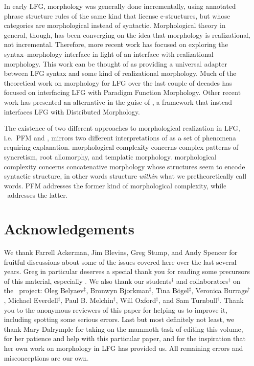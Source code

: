 \documentclass[output=paper,hidelinks]{langscibook}
\begin{document}
In early LFG, morphology was generally done incrementally, using
annotated phrase structure rules of the same kind that license
c-structures, but whose categories are morphological instead of
syntactic. Morphological theory in general, though, has been
converging on the idea that morphology is realizational, not
incremental. Therefore, more recent work has focused on exploring the
syntax--morphology interface
\citep[ch.\,12]{dalrymple15,DLM:LFG} in light of an interface with
realizational morphology. This work can be thought of as
providing a universal adapter between LFG syntax and some kind of
realizational morphology. Much of the theoretical work on
morphology for LFG over the last couple of decades has focused on
interfacing LFG with Paradigm Function Morphology. Other recent work has
presented an alternative in the guise of \lrfg, a framework that instead
interfaces LFG with Distributed Morphology.
 
The existence of two different approaches to morphological realization
in LFG, i.e.\ PFM and \lrfg, mirrors two different interpretations of
 as a set of phenomena requiring
explanation.  morphological complexity
\citep[see, e.g.,][]{baerman;etal2017} concerns
complex patterns of syncretism, root allomorphy, and templatic
morphology.   morphological complexity 
concerns concatenative morphology whose structures seem to encode
syntactic structure, in other words structure \emph{within} what we
pretheoretically call words. PFM addresses the former kind of
morphological complexity, while \lrfg\ addresses the latter. 

\section*{Acknowledgements}

We thank Farrell Ackerman, Jim Blevins, Greg Stump, and Andy Spencer
for fruitful discussions about some of the issues covered here over
the last several years. Greg in particular deserves a special thank
you for reading some precursors of this material, especially
. We also thank our students$^\dag$ and
collaborators$^\ddag$ on the \lrfg\ project: Oleg Belyaev$^\ddag$,
Bronwyn Bjorkman$^\ddag$, Tina B\"{o}gel$^\ddag$, Veronica
Burrage$^\dag$, Michael Everdell$^\ddag$, Paul B. Melchin$^\ddag$,
Will Oxford$^\ddag$, and Sam Turnbull$^\dag$. Thank you to the
anonymous reviewers of this paper for helping us to improve it,
including spotting some serious errors. Last
but most definitely not least, we thank Mary Dalrymple for taking on
the mammoth task of editing this volume, for her patience and help
with this particular paper, and for the inspiration that her own work
on morphology in LFG has provided us. All remaining errors and
misconceptions are our own.
\end{document}
